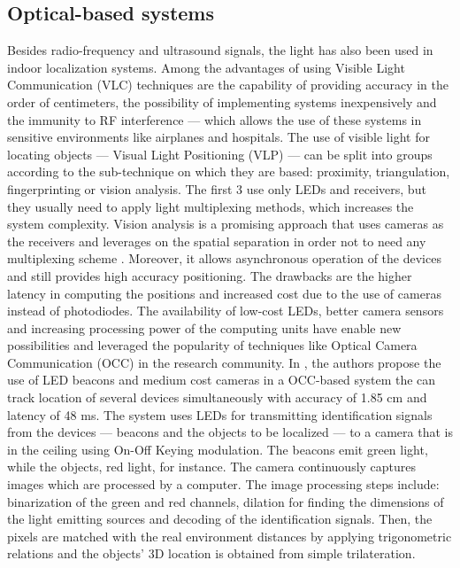 \subsection{Optical-based systems}
    Besides radio-frequency and ultrasound signals, the light has also been used in indoor localization systems. Among the advantages of using Visible Light Communication (VLC) techniques are the capability of providing accuracy in the order of centimeters, the possibility of implementing systems inexpensively and the immunity to RF interference — which allows the use of these systems in sensitive environments like airplanes and hospitals.
    The use of visible light for locating objects — Visual Light Positioning (VLP) — can be split into groups according to the sub-technique on which they are based: proximity, triangulation, fingerprinting or vision analysis. The first 3 use only LEDs and receivers, but they usually need to apply light multiplexing methods, which increases the system complexity. Vision analysis is a promising approach that uses cameras as the receivers and leverages on the spatial separation in order not to need any multiplexing scheme \cite{vlc-survey}. Moreover, it allows asynchronous operation of the devices and still provides high accuracy positioning. The drawbacks are the higher latency in computing the positions and increased cost due to the use of cameras instead of photodiodes.
    The availability of low-cost LEDs, better camera sensors and increasing processing power of the computing units have enable new possibilities and leveraged the popularity of techniques like Optical Camera Communication (OCC) in the research community. In \cite{occ-burbano}, the authors propose the use of LED beacons and medium cost cameras in a OCC-based system the can track location of several devices simultaneously with accuracy of 1.85 cm and latency of 48 ms.
    The system uses LEDs for transmitting identification signals from the devices  — beacons and the objects to be localized — to a camera that is in the ceiling using On-Off Keying modulation. The beacons emit green light, while the objects, red light, for instance. The camera continuously captures images which are processed by a computer. The image processing steps include: binarization of the green and red channels, dilation for finding the dimensions of the light emitting sources and decoding of the identification signals. Then, the pixels are matched with the real environment distances by applying trigonometric relations and the objects' 3D location is obtained from simple trilateration.
    
